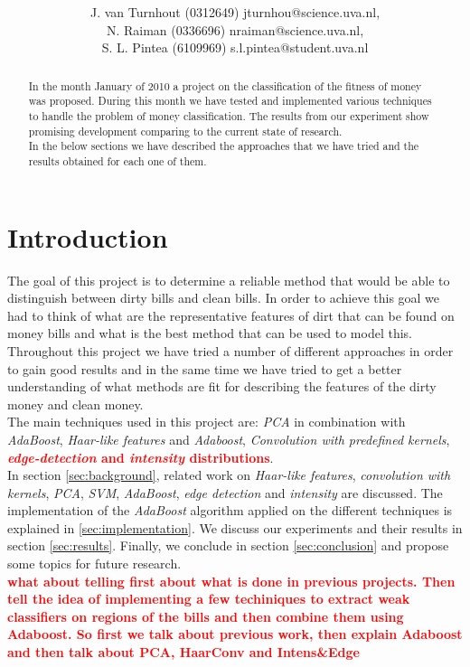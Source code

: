 \documentclass[11pt,twocolumn]{article}
\title{\tbf{Dirty Money:}\\\tbf{Feature selection using AdaBoost}}
\author{J. van Turnhout (0312649) jturnhou@science.uva.nl, 
	 \\ N. Raiman (0336696) nraiman@science.uva.nl, 
	 \\ S. L. Pintea (6109969) s.l.pintea@student.uva.nl}
\newcommand{\todo}[1]{\textcolor{red}{\textbf{#1}}}
\begin{document}
	\maketitle
	\begin{abstract}
		\hspace*{10px}In the month January of 2010 a project on the classification of
		the fitness of money was proposed. During this month we have tested and
		implemented various techniques to handle the problem of money classification.
		The results from our experiment show promising development comparing to the
		current state of research.\\ 
		\hspace*{10px}In the below sections we have described the approaches that we
		have tried and the results obtained for each one of them.
	\end{abstract}
	\section{Introduction}
		\hspace*{10px}The goal of this project is to determine a reliable method that
		would be able to distinguish between dirty bills and clean bills. In order to
		achieve this goal we had to think of what are the representative features of
		dirt that can be found on money bills and what is the best method that can be
		used to model this.\\  
		\hspace*{10px}Throughout this project we have tried a number of different
		approaches in order to gain good results and in the same time we have tried
		to get a better understanding of what methods are fit for describing the
		features of the dirty money and clean money.\\ 
		\hspace*{10px}The main techniques used in this project are: \emph{PCA} in
		combination with \emph{AdaBoost}, \emph{Haar-like features} and
		\emph{Adaboost}, \emph{Convolution with predefined kernels},
		\todo{\emph{edge-detection} and \emph{intensity} distributions}.\\ 
		\hspace*{10px}In section \ref{sec:background}, related work on
		\emph{Haar-like features}, \emph{convolution with kernels}, \emph{PCA},
		\emph{SVM}, \emph{AdaBoost}, \emph{edge detection} and \emph{intensity} are
		discussed. The implementation of the \emph{AdaBoost} algorithm applied on the
		different techniques is explained in \ref{sec:implementation}. We discuss our
		experiments and their results in section \ref{sec:results}. Finally, we
		conclude in section \ref{sec:conclusion} and propose some topics for future
		research.\\ 
		\todo{what about telling first about what is done in previous projects. Then
		tell the idea of implementing a few techiniques to extract weak classifiers
		on regions of the bills and then combine them using Adaboost. So first we
		talk about previous work, then explain Adaboost and then talk about PCA,
		HaarConv and Intens\&Edge}
	
\end{document}
